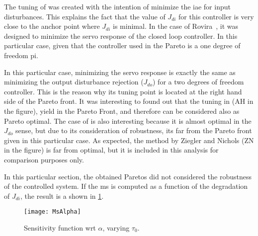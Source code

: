 The tuning of \citet{Murril1967} was created with the intention of minimize the \gls{iae} for input disturbances. This explains the fact that the value of $J_{di}$ for this controller is very close to the anchor point where $J_{di}$ is minimal. In the case of Rovira~\citep{Rovira1969}, it was designed to minimize the servo response of the closed loop controller. In this particular case, given that the controller used in the Pareto is a one degree of freedom \gls{pi}.

In this particular case, minimizing the servo response is exactly the same as minimizing the output disturbance rejection ($J_{do}$) for a two degrees of freedom controller. This is the reason why its tuning point is located at the right hand side of the Pareto front. It was interesting to found out that the tuning in \cite{Astrom1995} (AH in the figure), yield in the Pareto Front, and therefore can be considered also as Pareto optimal. The case of \citet{Grimholt2012} is also interesting because it is almost optimal in the $J_{do}$ sense, but due to its consideration of robustness, its far from the Pareto front given in this particular case. As expected, the method by Ziegler and Nichols \citep{Ziegler1942} (ZN in the figure) is far from optimal, but it is included in this analysis for comparison purposes only.

In this particular section, the obtained Paretos did not considered the robustness of the controlled system. If the \gls{ms} is computed as a function of the degradation of $J_{di}$, the result is a shown in \ref{fig:MsAlpha}.
%
\begin{figure}%
	\centering
	\texttt{[image: MsAlpha]}%
	\caption{Sensitivity function wrt $\alpha$, varying $\tau_0$.}%
	\label{fig:MsAlpha}%
\end{figure}
%

